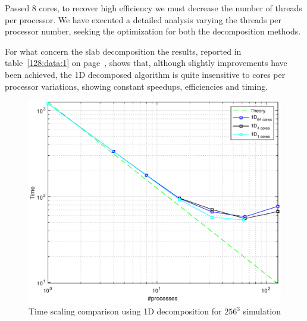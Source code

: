 \par
Passed 8 cores, to recover high efficiency we must decrease the number of threads per processor. We have executed a detailed analysis varying the threads per processor number, seeking the optimization for both the decomposition methods.
\par
For what concern the slab decomposition the results, reported in table~\ref{128:data:1} on page~\pageref{128:data:1}, shows that, although slightly improvements have been achieved, the 1D decomposed algorithm is quite insensitive to cores per processor variations, showing constant speedups, efficiencies and timing.\\
\par 
\begin{figure}
\begin{center}
\includegraphics[scale=0.6]{grafici/1284}
\caption{Time scaling comparison using 1D decomposition for $256^{3}$ simulation}
\label{1284}
\end{center}
\end{figure}
